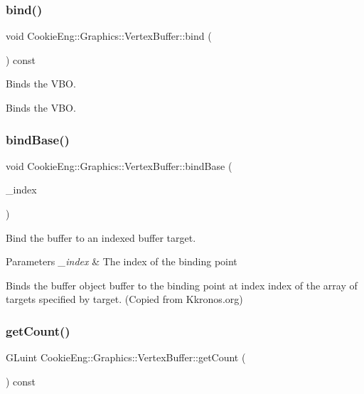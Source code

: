 \subsubsection{\texorpdfstring{bind()}{bind()}}
{\footnotesize\ttfamily void Cookie\+Eng\+::\+Graphics\+::\+Vertex\+Buffer\+::bind (\begin{DoxyParamCaption}{ }\end{DoxyParamCaption}) const}



Binds the V\+BO. 

Binds the V\+BO. \mbox{\label{class_cookie_eng_1_1_graphics_1_1_vertex_buffer_a3098cec29d253dd295586fc92bc48001}} 
\subsubsection{\texorpdfstring{bind\+Base()}{bindBase()}}
{\footnotesize\ttfamily void Cookie\+Eng\+::\+Graphics\+::\+Vertex\+Buffer\+::bind\+Base (\begin{DoxyParamCaption}\item[{G\+Luint}]{\+\_\+index }\end{DoxyParamCaption})}



Bind the buffer to an indexed buffer target. 


\begin{DoxyParams}{Parameters}
{\em \+\_\+index} & The index of the binding point\\
\hline
\end{DoxyParams}
Binds the buffer object buffer to the binding point at index index of the array of targets specified by target. (Copied from Kkronos.\+org) \mbox{\label{class_cookie_eng_1_1_graphics_1_1_vertex_buffer_a667b81c15525bd5f76d979e0c8b02be0}} 
\subsubsection{\texorpdfstring{get\+Count()}{getCount()}}
{\footnotesize\ttfamily G\+Luint Cookie\+Eng\+::\+Graphics\+::\+Vertex\+Buffer\+::get\+Count (\begin{DoxyParamCaption}{ }\end{DoxyParamCaption}) const\hspace{0.3cm}{\ttfamily [inline]}}



